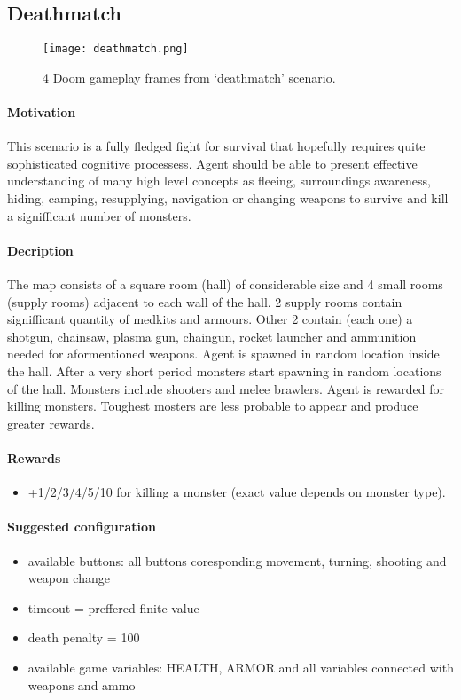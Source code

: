 	\subsection{Deathmatch}
		\begin{figure}
			\centering
			\texttt{[image: deathmatch.png]}
			\caption{4 Doom gameplay frames from `deathmatch' scenario.}\label{fig:deatchmatch}
		\end{figure}
		\paragraph{Motivation} 
	 		This scenario is a fully fledged fight for survival that hopefully requires quite sophisticated cognitive processess. Agent should be able to present effective understanding of many high level concepts as fleeing, surroundings awareness, hiding, camping, resupplying, navigation or changing weapons to survive and kill a signifficant number of monsters.

		\paragraph{Decription}
			The map consists of a square room (hall) of considerable size and 4 small rooms (supply rooms) adjacent to each wall of the hall. 2 supply rooms contain signifficant quantity of medkits and armours. Other 2 contain (each one) a shotgun, chainsaw, plasma gun, chaingun, rocket launcher and ammunition needed for aformentioned weapons. Agent is spawned in random location inside the hall. After a very short period monsters start spawning in random locations of the hall. Monsters include shooters and melee brawlers. Agent is rewarded for killing monsters. Toughest mosters are less probable to appear and produce greater rewards.
		\paragraph{Rewards}
			\begin{itemize}
				\item +1/2/3/4/5/10 for killing a monster (exact value depends on monster type).
			\end{itemize}
		
		\paragraph{Suggested configuration}
			\begin{itemize}
				\item available buttons: all buttons coresponding movement, turning, shooting and weapon change 
				\item timeout = preffered finite value
				\item death penalty = 100
				\item available game variables: HEALTH, ARMOR and all variables connected with weapons and ammo
			\end{itemize}		
	\newpage

